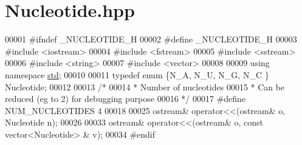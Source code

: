 \hypertarget{_nucleotide_8hpp_source}{}\section{Nucleotide.\+hpp}
\label{_nucleotide_8hpp_source}

\begin{DoxyCode}
00001 \textcolor{preprocessor}{#ifndef \_NUCLEOTIDE\_H}
00002 \textcolor{preprocessor}{#define \_NUCLEOTIDE\_H}
00003 \textcolor{preprocessor}{#include <iostream>}
00004 \textcolor{preprocessor}{#include <fstream>}
00005 \textcolor{preprocessor}{#include <sstream>}
00006 \textcolor{preprocessor}{#include <string>}
00007 \textcolor{preprocessor}{#include <vector>}
00008 
00009 \textcolor{keyword}{using namespace }\hyperlink{namespacestd}{std};
00010 
00011 \textcolor{keyword}{typedef} \textcolor{keyword}{enum} \{N\_A, N\_U, N\_G, N\_C \} Nucleotide;
00012 
00013 \textcolor{comment}{/*}
00014 \textcolor{comment}{ * Number of nucleotides}
00015 \textcolor{comment}{ * Can be reduced (eg to 2) for debugging purpose}
00016 \textcolor{comment}{ */}
00017 \textcolor{preprocessor}{#define NUM\_NUCLEOTIDES 4}
00018 
00025 ostream& operator<<(ostream& o, Nucleotide n);
00026 
00033 ostream& operator<<(ostream& o, const vector<Nucleotide> & v);
00034 \textcolor{preprocessor}{#endif}
\end{DoxyCode}

